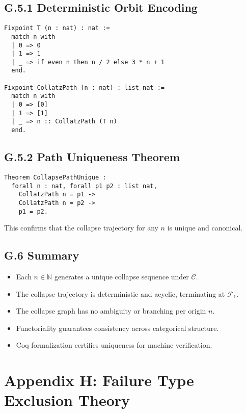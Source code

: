 \documentclass[11pt]{article}
\begin{document}
\subsection*{G.5.1 Deterministic Orbit Encoding}

\begin{lstlisting}[language=Coq]
Fixpoint T (n : nat) : nat :=
  match n with
  | 0 => 0
  | 1 => 1
  | _ => if even n then n / 2 else 3 * n + 1
  end.

Fixpoint CollatzPath (n : nat) : list nat :=
  match n with
  | 0 => [0]
  | 1 => [1]
  | _ => n :: CollatzPath (T n)
  end.
\end{lstlisting}

\subsection*{G.5.2 Path Uniqueness Theorem}

\begin{lstlisting}[language=Coq]
Theorem CollapsePathUnique :
  forall n : nat, forall p1 p2 : list nat,
    CollatzPath n = p1 ->
    CollatzPath n = p2 ->
    p1 = p2.
\end{lstlisting}

\noindent This confirms that the collapse trajectory for any \( n \) is unique and canonical.

\subsection*{G.6 Summary}

\begin{itemize}
  \item Each \( n \in \mathbb{N} \) generates a unique collapse sequence under \( \mathcal{C} \).
  \item The collapse trajectory is deterministic and acyclic, terminating at \( \mathcal{F}_1 \).
  \item The collapse graph has no ambiguity or branching per origin \( n \).
  \item Functoriality guarantees consistency across categorical structure.
  \item Coq formalization certifies uniqueness for machine verification.
\end{itemize}



\appendix
\section*{Appendix H: Failure Type Exclusion Theory}
\end{document}
